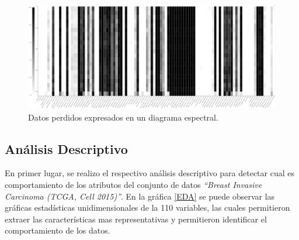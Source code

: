 \begin{figure}[!htb]
	\centering
	\includegraphics[width=1
	\linewidth]{IMAGENES/Missing_Spectrum}
	\caption{Datos perdidos expresados en un diagrama espectral.}
	\label{Missing_Spectrum}
\end{figure}


\subsection{Análisis Descriptivo }
En primer lugar, se realizo el respectivo análisis descriptivo para detectar cual es comportamiento de los atributos del conjunto de datos \textit{“Breast Invasive Carcinoma (TCGA, Cell 2015)”}. En la gráfica \ref{EDA} se puede observar las gráficas estadísticas unidimensionales de la 110 variables, las cuales permitieron extraer  las características mas representativas y permitieron identificar el comportamiento de los datos.

